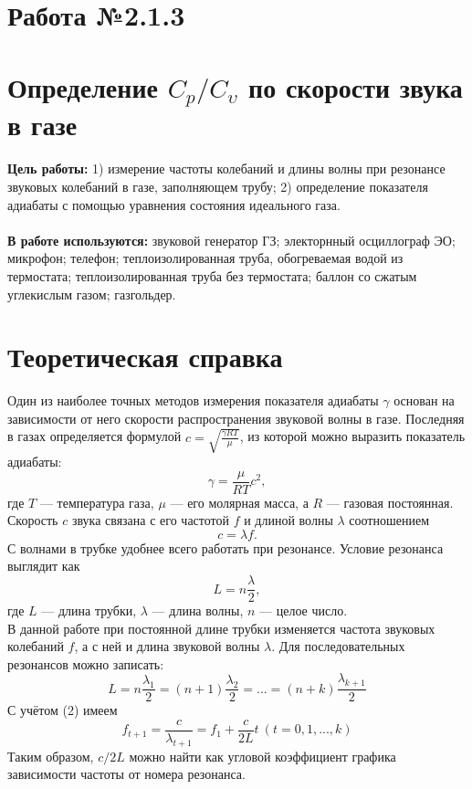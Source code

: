 \documentclass[12 pt, a4paper]{article}%
\begin{document}

\begin{center}
\section*{Работа №2.1.3}
    \section*{Определение $C_p/C_\upsilon$ по скорости звука в газе}
\end{center}
\textbf{Цель работы:} 1) измерение частоты колебаний и длины волны при резонансе звуковых колебаний в газе, заполняющем трубу; 2) определение показателя адиабаты с помощью уравнения состояния идеального газа.
 \\ \\
\textbf{В работе используются:} звуковой генератор ГЗ; электорнный осциллограф ЭО; микрофон; телефон; теплоизолированная труба, обогреваемая водой из термостата; теплоизолированная труба без термостата; баллон со сжатым углекислым газом; газгольдер.


\section*{Теоретическая справка}
Один из наиболее точных методов измерения показателя адиабаты $\gamma$ основан на зависимости от него скорости распространения звуковой волны в газе. Последняя в газах определяется формулой $c = \sqrt{\frac{\gamma RT}{\mu}}$, из которой можно выразить показатель адиабаты:
 	\begin{equation}\label{1}
 	\gamma = \frac{\mu}{RT}c^2,
 	\end{equation}
где $T$ --- температура газа, $\mu$ --- его молярная масса, а $R$ --- газовая постоянная. \\
Скорость $c$ звука связана с его частотой $f$ и длиной волны $\lambda$ соотношением
	\begin{equation}
	c = \lambda f.
	\end{equation}
С волнами в трубке удобнее всего работать при резонансе. Условие резонанса выглядит как
	\begin{equation}
	L = n\frac{\lambda}{2},
	\end{equation}
где $L$ --- длина трубки, $\lambda$ --- длина волны, $n$ --- целое число.\\
В данной работе при постоянной длине трубки изменяется частота звуковых колебаний $f$, а с ней и длина звуковой волны $\lambda$. Для последовательных резонансов можно записать:
	\begin{equation}
	L = n\frac{\lambda_1}{2} = (n + 1)\frac{\lambda_2}{2} = ... = (n + k)\frac{\lambda_{k + 1}}{2}
	\end{equation}
С учётом (2) имеем
	\begin{equation}
	f_{t+1} = \frac{c}{\lambda_{t+1}} = f_1 + \frac{c}{2L}t~ (t = 0, 1,..., k)
	\end{equation}
Таким образом, $c/2L$ можно найти как угловой коэффициент графика зависимости частоты от номера резонанса.
\end{document}
